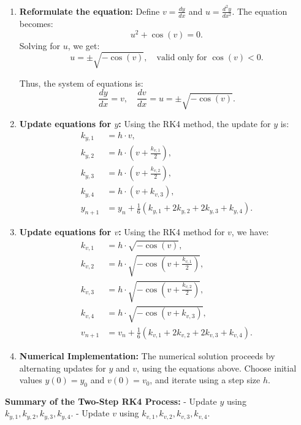 \documentclass[journal]{IEEEtran}
\begin{document}
\begin{enumerate}
    \item \textbf{Reformulate the equation:}
    Define \(v = \frac{dy}{dx}\) and \(u = \frac{d^2y}{dx^2}\). The equation becomes:
    \[
    u^2 + \cos(v) = 0.
    \]
    Solving for \(u\), we get:
    \[
    u = \pm \sqrt{-\cos(v)}, \quad \text{valid only for } \cos(v) < 0.
    \]

    Thus, the system of equations is:
    \[
    \frac{dy}{dx} = v, \quad \frac{dv}{dx} = u = \pm \sqrt{-\cos(v)}.
    \]

    \item \textbf{Update equations for \(y\):}
    Using the RK4 method, the update for \(y\) is:
    \begin{align*}
        k_{y,1} &= h \cdot v, \\
        k_{y,2} &= h \cdot \left(v + \frac{k_{v,1}}{2}\right), \\
        k_{y,3} &= h \cdot \left(v + \frac{k_{v,2}}{2}\right), \\
        k_{y,4} &= h \cdot \left(v + k_{v,3}\right), \\
        y_{n+1} &= y_n + \frac{1}{6}\left(k_{y,1} + 2k_{y,2} + 2k_{y,3} + k_{y,4}\right).
    \end{align*}

    \item \textbf{Update equations for \(v\):}
    Using the RK4 method for \(v\), we have:
    \begin{align*}
        k_{v,1} &= h \cdot \sqrt{-\cos(v)}, \\
        k_{v,2} &= h \cdot \sqrt{-\cos\left(v + \frac{k_{v,1}}{2}\right)}, \\
        k_{v,3} &= h \cdot \sqrt{-\cos\left(v + \frac{k_{v,2}}{2}\right)}, \\
        k_{v,4} &= h \cdot \sqrt{-\cos\left(v + k_{v,3}\right)}, \\
        v_{n+1} &= v_n + \frac{1}{6}\left(k_{v,1} + 2k_{v,2} + 2k_{v,3} + k_{v,4}\right).
    \end{align*}

    \item \textbf{Numerical Implementation:}
    The numerical solution proceeds by alternating updates for \(y\) and \(v\), using the equations above. Choose initial values \(y(0) = y_0\) and \(v(0) = v_0\), and iterate using a step size \(h\).
\end{enumerate}

\textbf{Summary of the Two-Step RK4 Process:}
- Update \(y\) using \(k_{y,1}, k_{y,2}, k_{y,3}, k_{y,4}\).
- Update \(v\) using \(k_{v,1}, k_{v,2}, k_{v,3}, k_{v,4}\).
\end{document}
